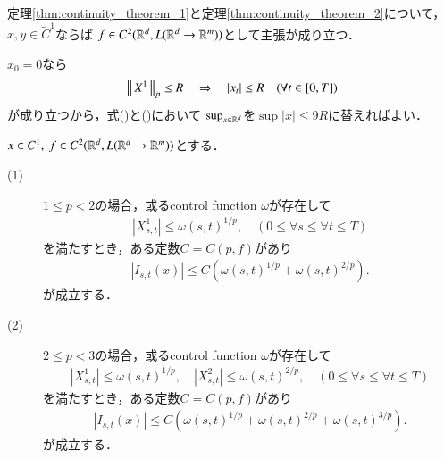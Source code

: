	\begin{screen}
		\begin{cor}
			定理\ref{thm:continuity_theorem_1}と定理\ref{thm:continuity_theorem_2}について，
			$x,y \in \tilde{C}^1$ならば
			$f \in C^2(\mathbb{R}^d,L(\mathbb{R}^d \rightarrow \mathbb{R}^m))$として主張が成り立つ．
		\end{cor}
	\end{screen}
	
	\begin{prf}
		$x_0 = 0$なら
		\begin{align}
			\left\|\, X^1\, \right\|_{p} \leq R \quad \Rightarrow \quad |x_t| \leq R \quad (\forall t \in [0,T])
		\end{align}
		が成り立つから，式()と()において
		$\operatorname*{sup}_{x\in\mathbb{R}^d} $を$\sup{|x| \leq 9R}$に替えればよい．
		\QED
	\end{prf}
	
	\begin{screen}
		\begin{lem}\label{lem:lemma_for_Young_integral}
			$x \in C^1,\ f \in C^2(\mathbb{R}^d,L(\mathbb{R}^d \rightarrow \mathbb{R}^m))$とする．
			\begin{description}
				\item[(1)]
					$1 \leq p < 2$の場合，或るcontrol function $\omega$が存在して
					\begin{align}
						\left| X^1_{s,t} \right|
						\leq \omega(s,t)^{1/p},
						\quad (0 \leq \forall s \leq \forall t \leq T)
					\end{align}
					を満たすとき，ある定数$C=C(p,f)$があり
					\begin{align}
						\left|I_{s,t}(x) \right|
						\leq C\left( \omega(s,t)^{1/p} + \omega(s,t)^{2/p} \right).
					\end{align}
					が成立する．
				\item[(2)] $2 \leq p < 3$の場合，或るcontrol function $\omega$が存在して
					\begin{align}
						\left| X^1_{s,t} \right| \leq \omega(s,t)^{1/p},
						\quad \left| X^2_{s,t} \right| \leq \omega(s,t)^{2/p},
						\quad (0 \leq \forall s \leq \forall t \leq T)
					\end{align}
					を満たすとき，ある定数$C=C(p,f)$があり
					\begin{align}
						\left|I_{s,t}(x) \right|
						\leq C\left( \omega(s,t)^{1/p} + \omega(s,t)^{2/p} + \omega(s,t)^{3/p} \right).
					\end{align}
					が成立する．
			\end{description}
		\end{lem}
	\end{screen}
	
